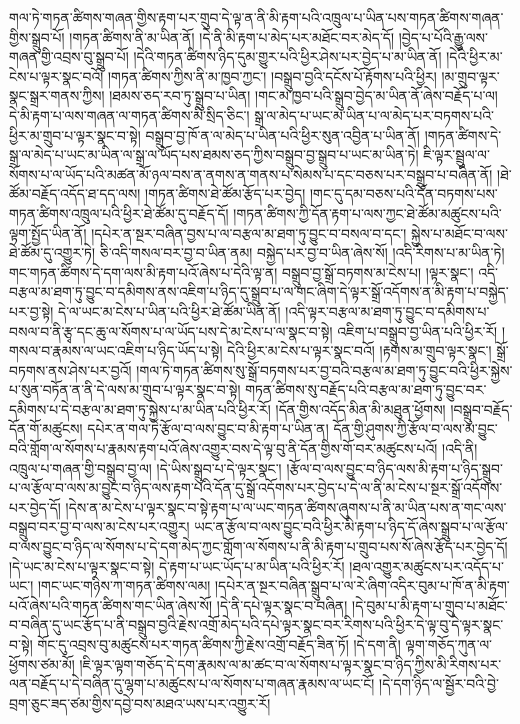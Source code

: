 གལ་ཏེ་གཏན་ཚིགས་གཞན་གྱིས་རྟག་པར་གྲུབ་དེ་ལྟ་ན་ནི་མི་རྟག་པའི་འཁྲུལ་པ་ཡིན་པས་གཏན་ཚིགས་གཞན་གྱིས་སྒྲུབ་པོ། །གཏན་ཚིགས་ནི་མ་ཡིན་ནོ། །དེ་ནི་མི་རྟག་པ་མེད་པར་མཐོང་བར་མེད་དོ། །བྱེད་པ་པོའི་རྒྱུ་ལས་གཞན་གྱི་འབྲས་བུ་སྒྲུབ་པོ། །དེའི་གཏན་ཚིགས་ཉིད་དུམ་གྱུར་པའི་ཕྱིར་ཤེས་པར་བྱེད་པ་མ་ཡིན་ནོ། །དེའི་ཕྱིར་མ་ངེས་པ་ལྟར་སྣང་བའོ། །གཏན་ཚིགས་ཀྱིས་ནི་མ་ཁྱབ་ཀྱང་། །བསྒྲུབ་བྱའི་དངོས་པོ་རྟོགས་པའི་ཕྱིར། །མ་གྲུབ་ལྟར་སྣང་སྒྲར་གནས་ཀྱིས། །ཐམས་ཅད་རབ་ཏུ་སྒྲུབ་པ་ཡིན། །གང་མ་ཁྱབ་པའི་སྒྲུབ་བྱེད་མ་ཡིན་ནོ་ཞེས་བརྗོད་པ་ལ། དེ་མི་རྟག་པ་ལས་གཞན་ལ་གཏན་ཚིགས་མི་སྲིད་ཅིང་། སྒྲ་ལ་མེད་པ་ཡང་མ་ཡིན་པ་ལ་མེད་པར་བཏགས་པའི་ཕྱིར་མ་གྲུབ་པ་ལྟར་སྣང་བ་སྟེ། བསྒྲུབ་བྱ་ཁོ་ན་ལ་མེད་པ་ཡིན་པའི་ཕྱིར་སུན་འབྱིན་པ་ཡིན་ནོ། །གཏན་ཚིགས་དེ་སྒྲ་ལ་མེད་པ་ཡང་མ་ཡིན་ལ་སྒྲ་ལ་ཡོད་པས་ཐམས་ཅད་ཀྱིས་བསྒྲུབ་བྱ་སྒྲུབ་པ་ཡང་མ་ཡིན་ཏེ། ཇི་ལྟར་སྦྲུལ་ལ་སོགས་པ་ལ་ཡོད་པའི་མཚན་མོ་ཉལ་བས་ན་ནགས་ན་གནས་པ་སེམས་པ་དང་བཅས་པར་བསྒྲུབ་པ་བཞིན་ནོ། །ཐེ་ཚོམ་བརྗོད་འདོད་ཐ་དད་ལས། །གཏན་ཚིགས་ཐེ་ཚོམ་རྩོད་པར་བྱེད། །གང་དུ་དམ་བཅས་པའི་དོན་བཏགས་པས་གཏན་ཚིགས་འཁྲུལ་པའི་ཕྱིར་ཐེ་ཚོམ་དུ་བརྗོད་དོ། །གཏན་ཚིགས་ཀྱི་དོན་རྟག་པ་ལས་ཀྱང་ཐེ་ཚོམ་མཚུངས་པའི་ལྟག་སྤྱོད་ཡིན་ནོ། །དཔེར་ན་སྔར་བཞིན་བྱས་པ་ལ་བརྩལ་མ་ཐག་ཏུ་བྱུང་བ་བསལ་བ་དང་། སྐྱེས་པ་མཐོང་བ་ལས་ཐེ་ཚོམ་དུ་འགྱུར་ཏེ། ཅི་འདི་གསལ་བར་བྱ་བ་ཡིན་ནམ། བསྐྱེད་པར་བྱ་བ་ཡིན་ཞེས་སོ། །འདི་རིགས་པ་མ་ཡིན་ཏེ། གང་གཏན་ཚིགས་དེ་དག་ལས་མི་རྟག་པའོ་ཞེས་པ་དེའི་ལྟ་ན། བསྒྲུབ་བྱ་སྒྲོ་བཏགས་མ་ངེས་པ། །ལྟར་སྣང་། འདི་བརྩལ་མ་ཐག་ཏུ་བྱུང་བ་དམིགས་ནས་འཇིག་པ་ཉིད་དུ་སྒྲུབ་པ་ལ་གང་ཞིག་དེ་ལྟར་སྒྲོ་འདོགས་ན་མི་རྟག་པ་བསྐྱེད་པར་བྱ་སྟེ། དེ་ལ་ཡང་མ་ངེས་པ་ཡིན་པའི་ཕྱིར་ཐེ་ཚོམ་ཡིན་ནོ། །འདི་ལྟར་བརྩལ་མ་ཐག་ཏུ་བྱུང་བ་དམིགས་པ་བསལ་བ་ནི་རྩྭ་དང་ཆུ་ལ་སོགས་པ་ལ་ཡོད་པས་དེ་མ་ངེས་པ་ལ་སྣང་བ་སྟེ། འཇིག་པ་བསྒྲུབ་བྱ་ཡིན་པའི་ཕྱིར་རོ། །གསལ་བ་རྣམས་ལ་ཡང་འཇིག་པ་ཉིད་ཡོད་པ་སྟེ། དེའི་ཕྱིར་མ་ངེས་པ་ལྟར་སྣང་བའོ། །རྟགས་མ་གྲུབ་ལྟར་སྣང་། སྒྲོ་བཏགས་ནས་ཤེས་པར་བྱའོ། །གལ་ཏེ་གཏན་ཚིགས་སུ་སྒྲོ་བཏགས་པར་བྱ་བའི་བརྩལ་མ་ཐག་ཏུ་བྱུང་བའི་ཕྱིར་སྐྱེས་པ་སུན་བཏོན་ན་ནི་དེ་ལས་མ་གྲུབ་པ་ལྟར་སྣང་བ་སྟེ། གཏན་ཚིགས་སུ་བརྗོད་པའི་བརྩལ་མ་ཐག་ཏུ་བྱུང་བར་དམིགས་པ་དེ་བརྩལ་མ་ཐག་ཏུ་སྐྱེས་པ་མ་ཡིན་པའི་ཕྱིར་རོ། །དོན་གྱིས་འདོད་མིན་མི་མཐུན་ཕྱོགས། །བསྒྲུབ་བརྗོད་དོན་གོ་མཚུངས། དཔེར་ན་གལ་ཏེ་རྩོལ་བ་ལས་བྱུང་བ་མི་རྟག་པ་ཡིན་ན། དོན་གྱི་ཤུགས་ཀྱི་རྩོལ་བ་ལས་མ་བྱུང་བའི་གློག་ལ་སོགས་པ་རྣམས་རྟག་པའོ་ཞེས་འགྱུར་བས་དེ་ལྟ་བུ་ནི་དོན་གྱིས་གོ་བར་མཚུངས་པའོ། །འདི་ནི། འཁྲུལ་པ་གཞན་གྱི་བསྒྲུབ་བྱ་ལ། །དེ་ཡིས་སྒྲུབ་པ་དེ་ལྟར་སྣང་། །རྩོལ་བ་ལས་བྱུང་བ་ཉིད་ལས་མི་རྟག་པ་ཉིད་སྒྲུབ་པ་ལ་རྩོལ་བ་ལས་མ་བྱུང་བ་ཉིད་ལས་རྟག་པའི་དོན་དུ་སྒྲོ་འདོགས་པར་བྱེད་པ་དེ་ལ་ནི་མ་ངེས་པ་སྔར་སྒྲོ་འདོགས་པར་བྱེད་དོ། །དེས་ན་མ་ངེས་པ་ལྟར་སྣང་བ་སྟེ་རྟག་པ་ལ་ཡང་གཏན་ཚིགས་ཞུགས་པ་ནི་མ་ཡིན་པས་ན་གང་ལས་བསྒྲུབ་བར་བྱ་བ་ལས་མ་ངེས་པར་འགྱུར། ཡང་ན་རྩོལ་བ་ལས་བྱུང་བའི་ཕྱིར་མི་རྟག་པ་ཉིད་དོ་ཞེས་སྒྲུབ་པ་ལ་རྩོལ་བ་ལས་བྱུང་བ་ཉིད་ལ་སོགས་པ་དེ་དག་མེད་ཀྱང་གློག་ལ་སོགས་པ་ནི་མི་རྟག་པ་གྲུབ་པས་སོ་ཞེས་རྩོད་པར་བྱེད་དོ། །དེ་ཡང་མ་ངེས་པ་ལྟར་སྣང་བ་སྟེ། དེ་རྟག་པ་ཡང་ཡོད་པ་མ་ཡིན་པའི་ཕྱིར་རོ། །ཐལ་འགྱུར་མཚུངས་པར་འདོད་པ་ཡང་། །གང་ཡང་གཉིས་ཀ་གཏན་ཚིགས་ལམ། །དཔེར་ན་སྔར་བཞིན་སྒྲུབ་པ་ལ་རེ་ཞིག་འདིར་བུམ་པ་ཁོ་ན་མི་རྟག་པའོ་ཞེས་པའི་གཏན་ཚིགས་གང་ཡིན་ཞེས་སོ། །དེ་ནི་དཔེ་ལྟར་སྣང་བ་བཞིན། །དེ་བུམ་པ་མི་རྟག་པ་གྲུབ་པ་མཐོང་བ་བཞིན་དུ་ཡང་རྩོད་པ་ནི་བསྒྲུབ་བྱའི་རྗེས་འགྲོ་མེད་པའི་དཔེ་ལྟར་སྣང་བར་རིགས་པའི་ཕྱིར་དེ་ལྟ་བུ་དེ་ལྟར་སྣང་བ་སྟེ། གོང་དུ་འབྲས་བུ་མཚུངས་པར་གཏན་ཚིགས་ཀྱི་རྗེས་འགྲོ་བརྗོད་ཟིན་ཏོ། །དེ་དག་ནི། ལྟག་གཅོད་ཀུན་ལ་ཕྱོགས་ཙམ་མོ། །ཇི་ལྟར་ལྟག་གཅོད་དེ་དག་རྣམས་ལ་མ་ཚང་བ་ལ་སོགས་པ་ལྟར་སྣང་བ་ཉིད་ཀྱིས་མི་རིགས་པར་ལན་བརྗོད་པ་དེ་བཞིན་དུ་ལྷག་པ་མཚུངས་པ་ལ་སོགས་པ་གཞན་རྣམས་ལ་ཡང་ངོ། །དེ་དག་ཉིད་ལ་སྦྱོར་བའི་བྱེ་བྲག་ཅུང་ཟད་ཙམ་གྱིས་དབྱེ་བས་མཐའ་ཡས་པར་འགྱུར་རོ། 